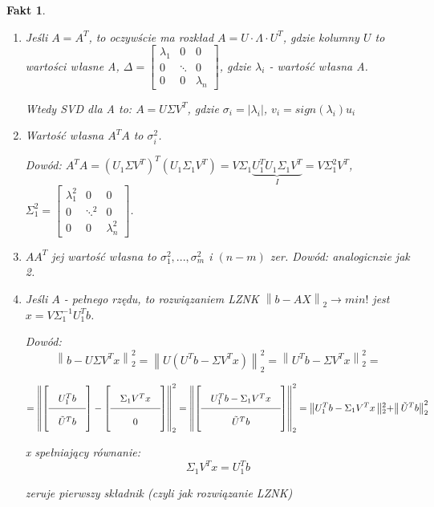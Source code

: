 \documentclass[hidelinks,a4paper,fleqn,oneside]{book}
\newcommand{\ra}{\rightarrow}
\newcommand{\norm}[1]{\left\lVert#1\right\rVert}
\newtheorem{fakt}{Fakt}
\begin{document}
\begin{fakt} $\ $ %
	\begin{enumerate}
		\item Jeśli $A=A^T$, to oczywście ma rozkład $A = U \cdot \Lambda \cdot U^T$, gdzie kolumny $U$ to wartości własne A, $\Delta = \begin{bmatrix}
		      \lambda_1 & 0 & 0\\ 
		      0 & \ddots & 0\\ 
		      0 & 0 & \lambda_n 
		\end{bmatrix}$, gdzie $\lambda_i$ - wartość własna A.
		
		Wtedy SVD dla A to:
		$A = U\Sigma V^T$, gdzie $\sigma_i = |\lambda_i|$, $v_i = sign(\lambda_i)u_i$
		 			
		\item Wartość własna $A^TA$ to $\sigma_i^2$.
		       			
		      Dowód: $A^TA = (U_1\Sigma V^T)^T(U_1 \Sigma_1 V^T) = V \Sigma_1 \underbrace{U_1^T U_1 \Sigma_1 V^T}_{I} = V \Sigma_1^2V^T$, $\Sigma_1^2 = \begin{bmatrix}
		      \lambda_1^2 & 0 & 0\\ 
		      0 & \ddots^2 & 0\\ 
		      0 & 0 & \lambda_n^2 
		\end{bmatrix}$.
				
		\item $AA^T$ jej wartość własna to $\sigma_1^2, ..., \sigma_m^2$ i $(n-m)$ zer.
		      Dowód: analogicnzie jak 2.
		      		
		\item Jeśli $A$ - pełnego rzędu, to rozwiązaniem LZNK $\norm{b - AX}_2 \ra min!$ jest $x = V\Sigma_1^{-1} U_1^Tb$.
		      		
		      Dowód:
		      \[
		      	\norm{b - U\Sigma V^Tx} _2 ^2 = \norm{U(U^Tb - \Sigma V^Tx)}_2^2 = \norm{U^Tb - \Sigma V^Tx}_2^2 =
		      	\]
		      	
		      	\[\arraycolsep=1em\def\arraystretch{2} = \norm{\left[\begin{array}{c}
		      	U_1^Tb\\ 
		      	\hline
		      	\tilde{U}^Tb
		      	\end{array}\right] - \left[\begin{array}{c}\Sigma_1V^Tx\\ \hline 0 \end{array}\right]}_2^2 = \norm{\left[\begin{array}{c}U_1^Tb - \Sigma_1V^Tx\\ \hline \tilde{U}^Tb \end{array}\right]}_2^2 =\norm{U_1^Tb - \Sigma_1V^Tx\norm{_2^2 +} \tilde{U}^Tb}_2^2
		      \]
		      
		      x spełniający równanie:
		      \[
		      	\Sigma_1V^Tx = U_1^Tb
		      \]
		      
		      zeruje pierwszy składnik (czyli jak rozwiązanie LZNK)
	\end{enumerate}
\end{fakt}
\end{document}
